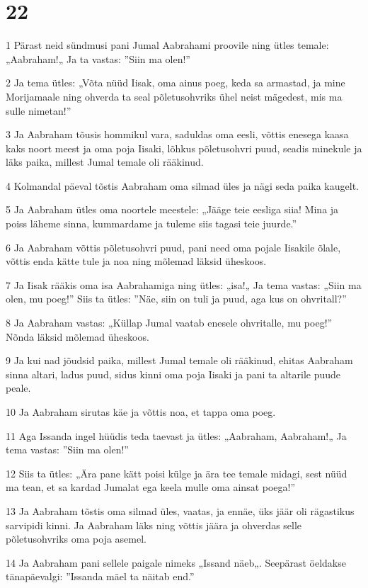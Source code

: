 \chapter{22}

\par 1 Pärast neid sündmusi pani Jumal Aabrahami proovile ning ütles temale: „Aabraham!„ Ja ta vastas: ”Siin ma olen!”
\par 2 Ja tema ütles: „Võta nüüd Iisak, oma ainus poeg, keda sa armastad, ja mine Morijamaale ning ohverda ta seal põletusohvriks ühel neist mägedest, mis ma sulle nimetan!”
\par 3 Ja Aabraham tõusis hommikul vara, saduldas oma eesli, võttis enesega kaasa kaks noort meest ja oma poja Iisaki, lõhkus põletusohvri puud, seadis minekule ja läks paika, millest Jumal temale oli rääkinud.
\par 4 Kolmandal päeval tõstis Aabraham oma silmad üles ja nägi seda paika kaugelt.
\par 5 Ja Aabraham ütles oma noortele meestele: „Jääge teie eesliga siia! Mina ja poiss läheme sinna, kummardame ja tuleme siis tagasi teie juurde.”
\par 6 Ja Aabraham võttis põletusohvri puud, pani need oma pojale Iisakile õlale, võttis enda kätte tule ja noa ning mõlemad läksid üheskoos.
\par 7 Ja Iisak rääkis oma isa Aabrahamiga ning ütles: „isa!„ Ja tema vastas: „Siin ma olen, mu poeg!” Siis ta ütles: ”Näe, siin on tuli ja puud, aga kus on ohvritall?”
\par 8 Ja Aabraham vastas: „Küllap Jumal vaatab enesele ohvritalle, mu poeg!” Nõnda läksid mõlemad üheskoos.
\par 9 Ja kui nad jõudsid paika, millest Jumal temale oli rääkinud, ehitas Aabraham sinna altari, ladus puud, sidus kinni oma poja Iisaki ja pani ta altarile puude peale.
\par 10 Ja Aabraham sirutas käe ja võttis noa, et tappa oma poeg.
\par 11 Aga Issanda ingel hüüdis teda taevast ja ütles: „Aabraham, Aabraham!„ Ja tema vastas: ”Siin ma olen!”
\par 12 Siis ta ütles: „Ära pane kätt poisi külge ja ära tee temale midagi, sest nüüd ma tean, et sa kardad Jumalat ega keela mulle oma ainsat poega!”
\par 13 Ja Aabraham tõstis oma silmad üles, vaatas, ja ennäe, üks jäär oli rägastikus sarvipidi kinni. Ja Aabraham läks ning võttis jäära ja ohverdas selle põletusohvriks oma poja asemel.
\par 14 Ja Aabraham pani sellele paigale nimeks „Issand näeb„. Seepärast öeldakse tänapäevalgi: ”Issanda mäel ta näitab end.”
